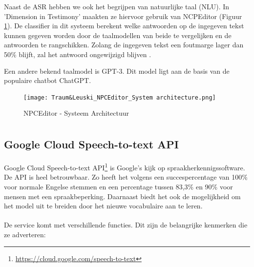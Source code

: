 Naast de ASR hebben we ook het begrijpen van natuurlijke taal (NLU). In 'Dimension in Testimony' maakten ze hiervoor gebruik van NCPEditor (Figuur \ref{fig:NPCEArchitecture}). De classifier in dit systeem berekent welke antwoorden op de ingegeven tekst kunnen gegeven worden door de taalmodellen van beide te vergelijken en de antwoorden te rangschikken. Zolang de ingegeven tekst een foutmarge lager dan 50\% blijft, zal het antwoord ongewijzigd blijven \autocite{Leuski2010}.

Een andere bekend taalmodel is GPT-3. Dit model ligt aan de basis van de populaire chatbot ChatGPT.

\begin{figure}[h]
    \centering
    \texttt{[image: Traum\&Leuski\_NPCEditor\_System architecture.png]}
    \caption{NPCEditor - Systeem Architectuur \autocite{Leuski2010}}
    \label{fig:NPCEArchitecture}
\end{figure}

\section{}\label{sec:Speech recognition}%

\subsection{Google Cloud Speech-to-text API}%

\paragraph{}
Google Cloud Speech-to-text API\footnote{\href{https://cloud.google.com/speech-to-text}{https://cloud.google.com/speech-to-text}} is Google's kijk op spraakherkennigssoftware. De API is heel betrouwbaar. Zo heeft het volgens \textcite{Anggraini2018} een succespercentage van 100\% voor normale Engelse stemmen en een percentage tussen 83,3\% en 90\% voor mensen met een spraakbeperking. Daarnaast biedt het ook de mogelijkheid om het model uit te breiden door het nieuwe vocabulaire aan te leren.

\paragraph{}
De service komt met verschillende functies. Dit zijn de belangrijke kenmerken die ze adverteren:

